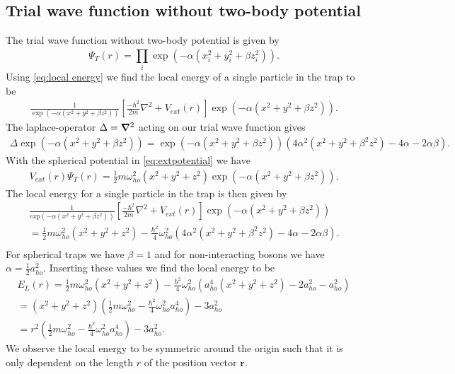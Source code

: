 \subsection{Trial wave function without two-body potential}
\label{sec:Trial wave function without two-body potential}
The trial wave function without two-body potential is given by
\begin{equation}
\label{eq:trial wave function without two-body potential}
	\Psi_T(r) = \prod_{i}^{} \exp(-\alpha (x_i^2 + y_i^2 + \beta z_i^2)) .
\end{equation}
Using \autoref{eq:local energy} we find the local energy of a single particle in the trap to be 
\begin{gather*}
	\frac{1}{\exp(-\alpha (x^2+y^2+\beta z^2))}\left[\frac{-\hbar^2}{2m} \nabla^2 + V _{ext}(r)\right]	\exp(-\alpha (x^2+y^2+\beta z^2)). 
\end{gather*}
The laplace-operator $\Delta  = \grad^2$  acting on our trial wave function gives
\begin{gather*}
\Delta \exp(-\alpha (x^2+y^2+\beta z^2)) = \exp(-\alpha (x^2+y^2+\beta z^2)) \left(4\alpha^2 (x^2+y^2+\beta^2 z^2) - 4 \alpha -2\alpha \beta \right). 
\end{gather*}
With the spherical potential in \autoref{eq:extpotential} we have
\begin{gather*}
V _{ext}(r) \Psi _T(r) = \frac{1}{2}m \omega _{ho}^2(x^2+y^2+z^2) \exp(-\alpha (x^2+y^2+\beta z^2)).
\end{gather*}
The local energy for a single particle in the trap is then given by
\begin{gather*}
\frac{1}{exp(-\alpha (x^2+y^2+\beta z^2))}\left[\frac{-\hbar^2}{2m} \nabla^2 + V _{ext}(r)\right]	\exp(-\alpha (x^2+y^2+\beta z^2)) \\
= \frac{1}{2}m \omega _{ho}^2(x^2+y^2+z^2) - \frac{\hbar ^2}{4} \omega _{ho}^2 \left(4\alpha^2 (x^2+y^2+\beta^2 z^2) - 4 \alpha -2\alpha \beta \right).\\
\end{gather*}
For spherical traps we have $\beta = 1$ and for non-interacting bosons we have $\alpha =\frac{1}{2}a ^2 _{ho}$. Inserting 
these values we find the local energy to be 
\begin{gather*}
E_L(r) = \frac{1}{2}m \omega _{ho}^2(x^2+y^2+z^2) - \frac{\hbar ^2}{4} \omega _{ho}^2 \left(a _{ho}^4 (x^2+y^2+z^2) - 2 a^2 _{ho} -a^2 _{ho} \right) \\
= (x^2+y^2+z^2)\left(\frac{1}{2}m\omega _{ho}^2-\frac{\hbar ^2}{4}\omega _{ho}^2a^4 _{ho}\right)-3a^2 _{ho} \\
= r^2 \left(\frac{1}{2}m\omega _{ho}^2-\frac{\hbar ^2}{4}\omega _{ho}^2a^4 _{ho}\right)-3a^2 _{ho}.
\end{gather*}
We observe the local energy to be symmetric around the origin such that it is only dependent on the 
length $r$ of the position vector $\boldsymbol{r}$. 


